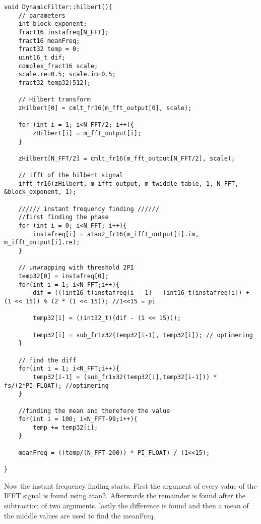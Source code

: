 \begin{verbatim}
void DynamicFilter::hilbert(){
	// parameters
	int block_exponent;
	fract16 instafreq[N_FFT];
	fract16 meanFreq;
	fract32 temp = 0;
	uint16_t dif;
	complex_fract16 scale;
	scale.re=0.5; scale.im=0.5;
	fract32 temp32[512];
			
	// Hilbert transform
	zHilbert[0] = cmlt_fr16(m_fft_output[0], scale);
	
	for (int i = 1; i<N_FFT/2; i++){
		zHilbert[i] = m_fft_output[i];
	}
		
	zHilbert[N_FFT/2] = cmlt_fr16(m_fft_output[N_FFT/2], scale);
	
	// ifft of the hilbert signal
	ifft_fr16(zHilbert, m_ifft_output, m_twiddle_table, 1, N_FFT, &block_exponent, 1);
		
	////// instant frequency finding //////
	//first finding the phase
	for (int i = 0; i<N_FFT; i++){
		instafreq[i] = atan2_fr16(m_ifft_output[i].im, m_ifft_output[i].re);
	}
	
	// unwrapping with threshold 2PI
	temp32[0] = instafreq[0];
	for(int i = 1; i<N_FFT;i++){
		dif = (((int16_t)instafreq[i - 1] - (int16_t)instafreq[i]) + (1 << 15)) % (2 * (1 << 15)); //1<<15 = pi
		
		temp32[i] = ((int32_t)(dif - (1 << 15)));
			
		temp32[i] = sub_fr1x32(temp32[i-1],	temp32[i]); // optimering
	}
		
	// find the diff
	for(int i = 1; i<N_FFT;i++){
		temp32[i-1] = (sub_fr1x32(temp32[i],temp32[i-1])) * fs/(2*PI_FLOAT); //optimering
	}
		
	//finding the mean and therefore the value
	for(int i = 100; i<N_FFT-99;i++){
		temp += temp32[i];
	}
		
	meanFreq = ((temp/(N_FFT-200)) * PI_FLOAT) / (1<<15);
		
}
\end{verbatim}
Now the instant frequency finding starts. First the argument of every value of the IFFT signal is found using atan2. Afterwards the remainder is found after the subtraction of two arguments. lastly the difference is found and then a mean of the middle values are used to find the meanFreq.

